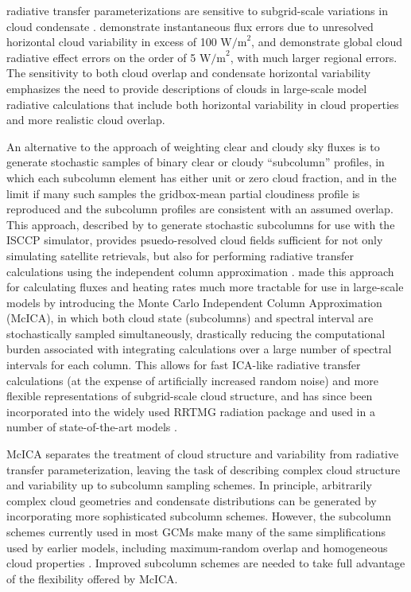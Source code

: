 radiative transfer parameterizations are sensitive to subgrid-scale
variations in cloud condensate
\citep[e.g.,][]{barker_et_al_1999, wu_and_liang_2005, oreopoulos_et_al_2012}.
\citet{barker_et_al_1999} demonstrate instantaneous flux errors due to
unresolved horizontal cloud variability in excess of 100
\(\textrm{W/m}^2\), and \citet{oreopoulos_et_al_2012} demonstrate global
cloud radiative effect errors on the order of 5 \(\textrm{W/m}^2\), with
much larger regional errors. The sensitivity to both cloud overlap and
condensate horizontal variability emphasizes the need to provide
descriptions of clouds in large-scale model radiative calculations that
include both horizontal variability in cloud properties and more
realistic cloud overlap.

An alternative to the approach of weighting clear and cloudy sky fluxes
is to generate stochastic samples of binary clear or cloudy
``subcolumn'' profiles, in which each subcolumn element has either unit
or zero cloud fraction, and in the limit if many such samples the
gridbox-mean partial cloudiness profile is reproduced and the subcolumn
profiles are consistent with an assumed overlap. This approach,
described by \citet{klein_and_jakob_1999} to generate stochastic
subcolumns for use with the ISCCP simulator, provides psuedo-resolved
cloud fields sufficient for not only simulating satellite retrievals,
but also for performing radiative transfer calculations using the
independent column approximation \citep[ICA;][]{cahalan_et_al_1994}.
\citet{pincus_et_al_2003} made this approach for calculating fluxes and
heating rates much more tractable for use in large-scale models by
introducing the Monte Carlo Independent Column Approximation (McICA), in
which both cloud state (subcolumns) and spectral interval are
stochastically sampled simultaneously, drastically reducing the
computational burden associated with integrating calculations over a
large number of spectral intervals for each column. This allows for fast
ICA-like radiative transfer calculations (at the expense of artificially
increased random noise) and more flexible representations of
subgrid-scale cloud structure, and has since been incorporated into the
widely used RRTMG radiation package and used in a number of
state-of-the-art models
\citep{iacono_et_al_2008, von_salzen_et_al_2012, neale_et_al_2010a, neale_et_al_2010b, donner_et_al_2011, hogan_et_al_2014}.

McICA separates the treatment of cloud structure and variability from
radiative transfer parameterization, leaving the task of describing
complex cloud structure and variability up to subcolumn sampling
schemes. In principle, arbitrarily complex cloud geometries and
condensate distributions can be generated by incorporating more
sophisticated subcolumn schemes. However, the subcolumn schemes
currently used in most GCMs make many of the same simplifications used
by earlier models, including maximum-random overlap and homogeneous
cloud properties \citep[e.g.;][]{neale_et_al_2010a, neale_et_al_2010b}.
Improved subcolumn schemes are needed to take full advantage of the
flexibility offered by McICA.

